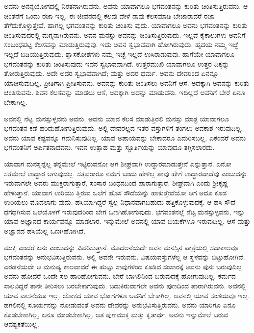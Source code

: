 ಅವನು ಅನನ್ಯಯೋಗದಲ್ಲಿ ನಿರತನಾಗಿರುವನು. ಅವನು ಯಾವಾಗಲೂ ಭಗವಂತನನ್ನು ಕುರಿತು ಚಿಂತಿಸುತ್ತಿರುವನು. ಆ ಚಿಂತನೆಗೆ ಒಂದು ರಜಾ ಇಲ್ಲ. ಈ ಜೀವನದಲ್ಲಿ ಕೆಲವು ವೇಳೆ ನಾವು ಕೆಲಸಮಾಡಿ ಬೇಜಾರಾದರೆ ರಜಾ ತೆಗೆದುಕೊಳ್ಳುತ್ತೇವೆ. ಹಾಗಲ್ಲ ಭಗವಂತನನ್ನು ಕುರಿತು ಚಿಂತಿಸು ವುದು. ಯಾವಾಗಲೂ ಅವನು ಭಗವಂತನನ್ನು ಕುರಿತು ಚಿಂತಿಸುವುದರಲ್ಲಿ ಮಗ್ನನಾಗಿರುವನು. ಅವನ ಮನಸ್ಸು ಅವನನ್ನು ಚಿಂತಿಸುತ್ತಿರುವುದು. ಇಲ್ಲವೆ ಕೈಕಾಲುಗಳು ಅವನಿಗೆ ಸಂಬಂಧಪಟ್ಟ ಕೆಲಸವನ್ನು ಮಾಡುತ್ತಿರುವುವು. ಇದು ಅವನ ಸ್ವಭಾವವಾಗಿ ಹೋಗಿರುವುದು. ಹೃದಯ ನಮ್ಮ ಇಚ್ಛೆ ಇಲ್ಲದೆ ಬಡಿಯುತ್ತಿರುವುದು. ಶ್ವಾಸಕೋಶಗಳು ನಮ್ಮ ಇಚ್ಛೆ ಇಲ್ಲದೆ ಉಸಿರಾಡುವುವು. ಹಾಗೆಯೇ ಯಾವಾಗಲೂ ಭಗವಂತನನ್ನು ಕುರಿತು ಚಿಂತಿಸುವುದು ಇವನ ಸ್ವಭಾವವಾಗಿದೆ. ಉತ್ತರಮುಖಿ ಯಾವಾಗಲೂ ಉತ್ತರ ದಿಕ್ಕನ್ನು ತೋರುತ್ತಿರುವುದು. ಅದೇ ಅದರ ಸ್ವಭಾವವಾಗಿದೆ; ಮತ್ತು ಅದರ ಧರ್ಮ. ಅವನು ದೇವರಿಂದ ಏನನ್ನೂ ಯಾಚಿಸುವುದಿಲ್ಲ. ಪ್ರೀತಿಗಾಗಿ ಪ್ರೀತಿಸುವನು. ಅವನನ್ನು ಕುರಿತು ಚಿಂತಿಸಲು ಅವನಿಗೆ ಆಸೆ. ಅದಕ್ಕಾಗಿ ಅವನನ್ನು ಕುರಿತು ಚಿಂತಿಸುವನು. ಶಿವನ ಕೆಲಸವನ್ನು ಮಾಡಲು ಆಸೆ, ಅದಕ್ಕಾಗಿ ಅದನ್ನು ಮಾಡುವನು. ಇದಿಲ್ಲದೆ ಅವನಿಗೆ ಬೇರೆ ಏನೂ ಬೇಕಾಗಿಲ್ಲ.

ಅವನಲ್ಲಿ ನೆಟ್ಟ ಮನಸ್ಸುಳ್ಳವನು ಅವನು. ಅವನು ಯಾವ ಕೆಲಸ ಮಾಡುತ್ತಿರಲಿ ಮನಸ್ಸು ಮಾತ್ರ ಯಾವಾಗಲೂ ಭಗವಂತನ ಕಡೆ ಹರಿದುಹೋಗುತ್ತಿರುವುದು. ಅಲ್ಲಿ ದೇವರಲ್ಲದ ಇತರ ವಸ್ತುಗಳಿಗೆ ತಂಗಲು ಅವಕಾಶ ಇರುವುದಿಲ್ಲ. ಅವನು ಯಾವ ಕಷ್ಟವನ್ನೂ ಗಮನಿಸುವುದಿಲ್ಲ. ಯಾವ ಅಪಾಯವನ್ನು ಬೇಕಾದರೂ ಎದುರಿಸಬಲ್ಲ. ಏಕೆಂದರೆ ಅವನು ಭಗವಂತನಿಗೆ ಅರ್ಪಿತನಾದವನು. ಇವನ ಉತ್ಸಾಹ ಮತ್ತು ಸ್ಫೂರ್ತಿಯನ್ನು ಯಾವುದೂ ತಗ್ಗಿಸಲಾರದು.

ಯಾವಾಗ ಮನಸ್ಸನ್ನೆಲ್ಲ ತನ್ನಮೇಲೆ ಇಟ್ಟಿರುವನೋ ಆಗ ಶೀಘ್ರವಾಗಿ ಉದ್ಧಾರಮಾಡುತ್ತೇನೆ ಎನ್ನುತ್ತಾನೆ. ಏನೋ ಸತ್ತಮೇಲೆ ಉದ್ಧಾರ ಆಗುವುದಲ್ಲ. ಸತ್ತವರಾರೂ ನಮಗೆ ಬಂದು ಹೇಳಿಲ್ಲ ತಾವು ಹೇಗೆ ಉದ್ಧಾರವಾದೆವು ಎಂಬುದನ್ನು. ಇರುವಾಗಲೇ ಅವರು ಮುಕ್ತರಾಗುತ್ತಾರೆ, ಸಂಸಾರ ಬಂಧನದಿಂದ ಪಾರಾಗುತ್ತಾರೆ. ಶೀಘ್ರವಾಗಿ ಎಂದು ಶ‍್ರೀಕೃಷ್ಣ ಹೇಳುತ್ತಾನೆ. ಯಾವಾಗ ಉರಿಯು ತ್ತಿರುವ ಒಲೆಗೆ ಹೊಸ ಸೌದೆಯನ್ನು ಹಾಕುತ್ತೇವೆಯೋ ಆಗ ಅದೂ ಕೂಡ ಉರಿಯಲು ಮೊದಲಾಗು ವುದು. ಹಸಿಯಾಗಿದ್ದರೆ ಸ್ವಲ್ಪ ನಿಧಾನವಾಗಬಹುದು ಹತ್ತಿಕೊಳ್ಳುವುದಕ್ಕೆ. ಆ ಹಸಿ ಸೌದೆ ಧಗಧಗಿಸುವ ಒಲೆಯೊಳಗೆ ಇರುವುದರಿಂದ ಬೇಗ ಒಣಗಿಹೋಗುವುದು. ಭಗವಂತನಲ್ಲೆ ನೆಟ್ಟ ಮನಸ್ಸುಳ್ಳವನು, ಇನ್ನು ಯಾವ ಅಜ್ಞಾನದ ಕಾರ್ಯವನ್ನೂ ಮಾಡಲಾರ. ಇನ್ನುಮೇಲೆ ಅವನಲ್ಲಿ ಯಾವ ಬಯಕೆಗಳೂ ಇರುವುದಿಲ್ಲ. ಆಸೆ ಮತ್ತು ಅಜ್ಞಾನದ ಹಸಿಯೆಲ್ಲ ಒಣಗಿಹೋಗಿದೆ.

ಮುಕ್ತಿ ಎಂದರೆ ಏನು ಎಂಬುದನ್ನು ವಿವರಿಸುತ್ತಾನೆ. ಮೊದಲನೆಯದೇ ಅವನ ಮನಸ್ಸಿನ ಪಾತ್ರೆಯಲ್ಲಿ ಸದಾಕಾಲವೂ ಭಗವಂತನನ್ನು ಅನುಭವಿಸುತ್ತಿರುವನು. ಅಲ್ಲಿ ಅವನೇ ಇರುವನು. ವಿಷಯವಸ್ತುಗಳೆಲ್ಲ ಆ ಸ್ಥಳವನ್ನು ಬಿಟ್ಟುಹೋಗಿವೆ. ಎರಡನೆಯದೇ ಆ ಮನುಷ್ಯ ಕಾಲವಾದರೆ ಈ ಹುಟ್ಟು ಸಾವುಗಳಿಂದ ಕೂಡಿದ ಸಂಸಾರಕ್ಕೆ ಅವನು ಪುನಃ ಬರುವುದಿಲ್ಲ. ಅವನು ಹೋದರೆ ಒಂದೇ ಸಲ ಹಾರಿಹೋಗುವನು. ಬೇರೆ ಬಾಗಿಲಿನಿಂದ ಬರುವುದಕ್ಕೆ ಹೋಗುವುದಿಲ್ಲ. ಕರ್ಮದ ಸಾಲವಿದ್ದರೆ ತಾನೇ ತೀರಿಸಲು ಬರಬೇಕಾಗುವುದು. ಬದುಕಿರುವಾಗಲೇ ಅವನು ಪುಣದಿಂದ ಪಾರಾಗಿರುವನು. ಅವನಲ್ಲಿ ಯಾವ ವಾಸನೆಯೂ ಇಲ್ಲ. ಲೋಕದ ಯಾವ ಭೋಗಗಳೂ ಅವನಿಗೆ ಬೇಕಾಗಿಲ್ಲ. ಅವನಲ್ಲಿ ಯಾವ ಸಂಶಯವೂ ಇಲ್ಲ. ಹಗಲಿನಲ್ಲಿ ಸೂರ್ಯನನ್ನು ನೋಡುವಂತೆ ಅವನು ದೇವರನ್ನು ಅನುಭವಿಸುತ್ತಿರುವನು. ಅವನು ಯಾರಿಗೂ ಏನೂ ಕೊಡಬೇಕಾಗಿಲ್ಲ, ಏನೂ ಮಾಡಬೇಕಾಗಿಲ್ಲ. ಆತ ಪುಣಮುಕ್ತ ಮತ್ತು ಕೃತಾರ್ಥ. ಅವನು ಇನ್ನುಮೇಲೆ ಬರುವ ಆವಶ್ಯಕತೆಯಿಲ್ಲ.

